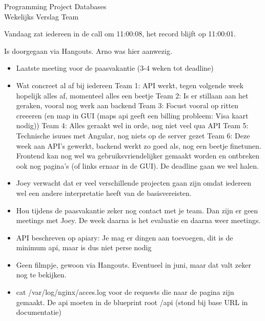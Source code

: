 \documentclass{article}
\newcounter{team}
\begin{document}

	\begin{Minutes}{Programming Project Databases \\ Wekelijks Verslag Team }
		\missingNoExcuse{/}
		\missingExcused{/}

		\maketitle

		    Vandaag zat iedereen in de call om 11:00:08, het record blijft op 11:00:01.

    		Is doorgegaan via Hangouts. Arno was hier aanwezig.
    		\begin{itemize}
    		    \item Laatste meeting voor de paasvakantie (3-4 weken tot deadline)
    		    \item Wat concreet al af bij iedereen
    		        \subitem Team 1: API werkt, tegen volgende week hopelijk alles af, momenteel alles een beetje
    		        \subitem Team 2: Is er stillaan aan het geraken, vooral nog werk aan backend
    		        \subitem Team 3: Focust vooral op ritten creeeren (en map in GUI (maps api geeft een billing probleem: Visa kaart nodig))
    		        \subitem Team 4: Alles geraakt wel in orde, nog niet veel qua API
    		        \subitem Team 5:  Technische isuues met Angular, nog niets op de server gezet
    		        \subitem Team 6: Deze week aan API's gewerkt, backend werkt zo goed als, nog een beetje finetunen. Frontend kan nog wel wa gebruiksvriendelijker gemaakt worden en ontbreken ook nog pagina's (of links ernaar in de GUI). De deadline gaan we wel halen.
    		    \item Joey verwacht dat er veel verschillende projecten gaan zijn omdat iedereen wel een andere interpretatie heeft van de basisvereisten.
    		    \item Hou tijdens de paasvakantie zeker nog contact met je team. Dan zijn er geen meetings met Joey. De week daarna is het evaluatie en daarna weer meetings.
    		    \item API beschreven op apiary: Je mag er dingen aan toevoegen, dit is de minimum api, maar is dus niet perse nodig
    		    \item Geen filmpje, gewoon via Hangouts. Eventueel in juni, maar dat valt zeker nog te bekijken.
    		    \item cat /var/log/nginx/acces.log voor de requests die naar de pagina zijn gemaakt. De api moeten in de blueprint root /api (stond bij base URL in documentatie)
    		\end{itemize}


\end{Minutes}
\end{document}
